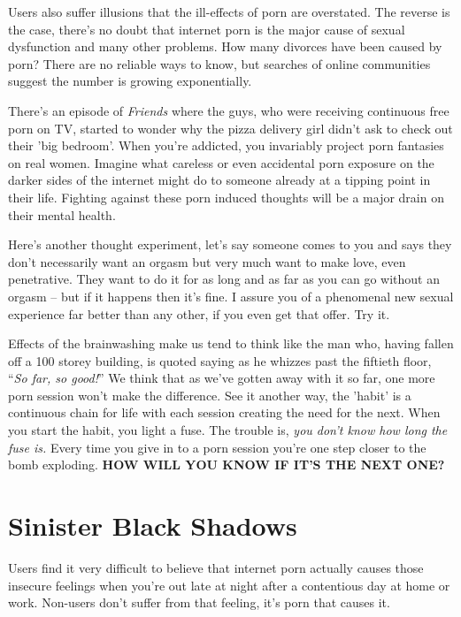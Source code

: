 \documentclass[
]{book}
\begin{document}
Users also suffer illusions that the ill-effects of porn are overstated. The reverse is the case, there's no doubt that internet porn is the major cause of sexual dysfunction and many other problems. How many divorces have been caused by porn? There are no reliable ways to know, but searches of online communities suggest the number is growing exponentially.

There's an episode of \emph{Friends} where the guys, who were receiving continuous free porn on TV, started to wonder why the pizza delivery girl didn't ask to check out their 'big bedroom'. When you're addicted, you invariably project porn fantasies on real women. Imagine what careless or even accidental porn exposure on the darker sides of the internet might do to someone already at a tipping point in their life. Fighting against these porn induced thoughts will be a major drain on their mental health.

Here's another thought experiment, let's say someone comes to you and says they don't necessarily want an orgasm but very much want to make love, even penetrative. They want to do it for as long and as far as you can go without an orgasm -- but if it happens then it's fine. I assure you of a phenomenal new sexual experience far better than any other, if you even get that offer. Try it.

Effects of the brainwashing make us tend to think like the man who, having fallen off a 100 storey building, is quoted saying as he whizzes past the fiftieth floor, ``\emph{So far, so good!}'' We think that as we've gotten away with it so far, one more porn session won't make the difference. See it another way, the 'habit' is a continuous chain for life with each session creating the need for the next. When you start the habit, you light a fuse. The trouble is, \emph{you don't know how long the fuse is.} Every time you give in to a porn session you're one step closer to the bomb exploding. \textbf{HOW WILL YOU KNOW IF IT'S THE NEXT ONE?}

\hypertarget{sinister-black-shadows}{%
\section{Sinister Black Shadows}\label{sinister-black-shadows}}

Users find it very difficult to believe that internet porn actually causes those insecure feelings when you're out late at night after a contentious day at home or work. Non-users don't suffer from that feeling, it's porn that causes it.
\end{document}
